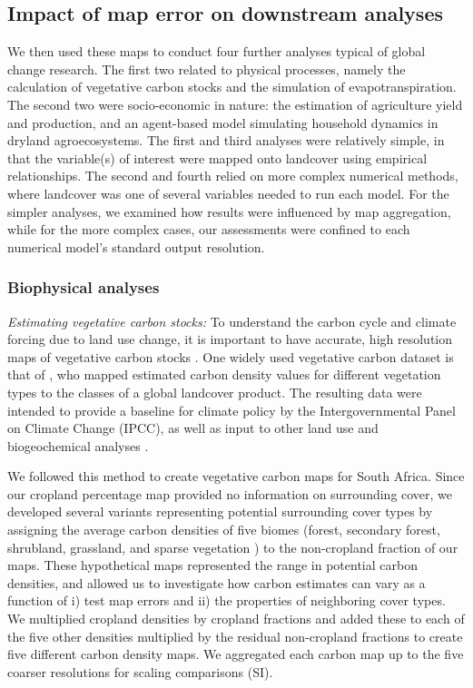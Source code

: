\documentclass[a4paper]{article}
\begin{document}
\subsection*{Impact of map error on downstream analyses}
We then used these maps to conduct four further analyses typical of global change research. The first two related to physical processes, namely the calculation of vegetative carbon stocks and the simulation of evapotranspiration. The second two were socio-economic in nature: the estimation of agriculture yield and production, and an agent-based model simulating household dynamics in dryland agroecosystems.  The first and third analyses were relatively simple, in that the variable(s) of interest were mapped onto landcover using empirical relationships. The second and fourth relied on more complex numerical methods, where landcover was one of several variables needed to run each model. For the simpler analyses, we examined how results were influenced by map aggregation, while for the more complex cases, our assessments were confined to each numerical model's standard output resolution. 

\subsubsection*{Biophysical analyses}
\emph{Estimating vegetative carbon stocks: }
To understand the carbon cycle and climate forcing due to land use change, it is important to have accurate, high resolution maps of vegetative carbon stocks \citep[][]{searchinger_high_2015}. One widely used vegetative carbon dataset is that of \citep{ruesch_new_2008}, who mapped estimated carbon density values for different vegetation types to the classes of a global landcover product. The resulting data were intended to provide a baseline for climate policy by the Intergovernmental Panel on Climate Change (IPCC), as well as input to other land use and biogeochemical analyses \citep{ruesch_new_2008}. 

We followed this method to create vegetative carbon maps for South Africa. Since our cropland percentage map provided no information on surrounding cover, we developed several variants representing potential surrounding cover types by assigning the average carbon densities of five biomes (forest, secondary forest, shrubland, grassland, and sparse vegetation \citep{ruesch_new_2008}) to the non-cropland fraction of our maps. These hypothetical maps represented the range in potential carbon densities, and allowed us to investigate how carbon estimates can vary as a function of i) test map errors and ii) the properties of neighboring cover types. We multiplied cropland densities by cropland fractions and added these to each of the five other densities multiplied by the residual non-cropland fractions to create five different carbon density maps. We aggregated each carbon map up to the five coarser resolutions for scaling comparisons (SI). 
\end{document}
